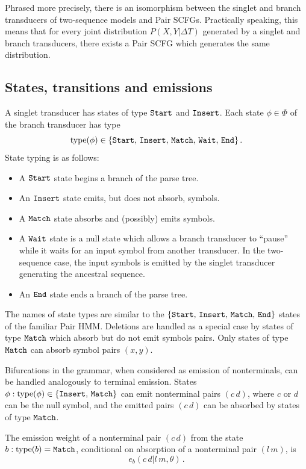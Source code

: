 \documentclass[10pt]{article}
\begin{document}
Phrased more precisely, there is an isomorphism between the singlet and branch transducers of two-sequence models
and Pair SCFGs.  Practically speaking, this means that for every joint distribution $P(X, Y | \Delta T)$ 
generated by a singlet and branch transducers, there exists a Pair SCFG which generates the same distribution.

\subsection{States, transitions and emissions}
A singlet transducer has states of type $\mathtt{Start}$ and $\mathtt{Insert}$.
Each state $\phi\in\Phi$ of the branch transducer has type
\[ \operatorname{type}(\phi) \in \lbrace\mathtt{Start},\,\mathtt{Insert},\,\mathtt{Match},\,\mathtt{Wait},\,\mathtt{End}\rbrace \, . \]
State typing is as follows:
\begin{itemize}
  \item A $\mathtt{Start}$ state begins a branch of the parse tree.
  \item An $\mathtt{Insert}$ state emits, but does not absorb, symbols.
  \item A $\mathtt{Match}$ state absorbs and (possibly) emits symbols.
  \item A $\mathtt{Wait}$ state is a null state which allows a branch transducer to ``pause''
    while it waits for an input symbol from another transducer.
    In the two-sequence case, the input symbols is emitted by the singlet transducer generating
    the ancestral sequence.
  \item An $\mathtt{End}$ state ends a branch of the parse tree.
\end{itemize}
The names of state types are similar to the $\{\mathtt{Start},\,\mathtt{Insert},\,\mathtt{Match},\,\mathtt{End}\}$ states of the familiar Pair HMM.
Deletions are handled as a special case by states of type $\mathtt{Match}$ which absorb but do not emit symbols pairs.
Only states of type $\mathtt{Match}$ can absorb symbol pairs $(x,y)$.

Bifurcations in the grammar, when considered as emission of nonterminals, can be handled analogously
to terminal emission.  States $\phi: \operatorname{type}(\phi) \in \{\mathtt{Insert},\,\mathtt{Match}\}$ can emit nonterminal pairs $(c\,d)$,
where $c$ or $d$ can be the null symbol, and the emitted pairs $(c\,d)$ can be absorbed by states of type $\mathtt{Match}$.

The emission weight of a nonterminal pair $(c\,d)$ from the state $b: \operatorname{type}(b) = \mathtt{Match}$, 
conditional on absorption of a nonterminal pair $(l\,m)$, is 
\[ e_b ( c\,d|l\,m,\theta ) \, . \]
\end{document}
